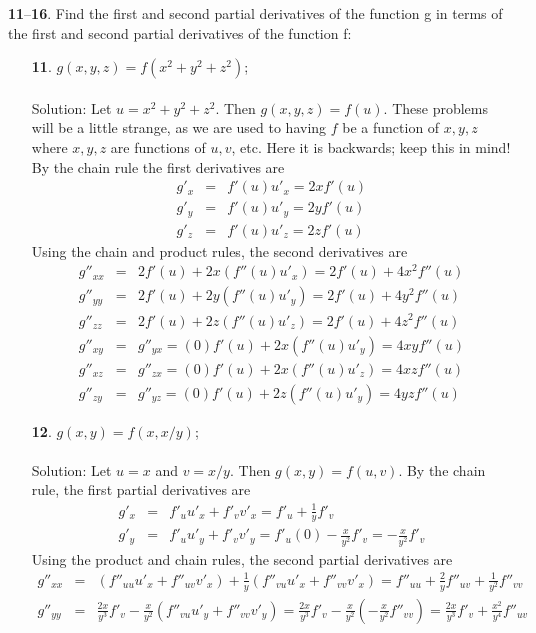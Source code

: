 \documentclass[12pt]{amsbook}
\begin{document}
{\small {\bf 11}--{\bf 16}}. Find the first and second partial derivatives of the function g in
terms of the first and second partial derivatives of the function f:
\begin{enumerate}
\item[{\small\bf 11}.] $g(x,y,z)=f(x^2+y^2+z^2)$;
\\
\\
{\sc Solution}: Let $u=x^2+y^2+z^2$. Then $g(x,y,z)=f(u)$. These problems will be a little strange, as we are used to having $f$ be a function of $x,y,z$ where $x,y,z$ are functions of $u,v$, etc. Here it is backwards; keep this in mind! By the chain rule the first derivatives are
\begin{eqnarray*}
g'_x&=&f'(u)u'_x=2xf'(u) \\
g'_y&=&f'(u)u'_y=2yf'(u) \\
g'_z&=&f'(u)u'_z=2zf'(u)
\end{eqnarray*}
Using the chain and product rules, the second derivatives are
\begin{eqnarray*}
g''_{xx}&=&2f'(u)+2x(f''(u)u'_x)=2f'(u)+4x^2f''(u) \\
g''_{yy}&=&2f'(u)+2y(f''(u)u'_y)=2f'(u)+4y^2f''(u) \\
g''_{zz}&=&2f'(u)+2z(f''(u)u'_z)=2f'(u)+4z^2f''(u) \\
g''_{xy}&=&g''_{yx}=(0)f'(u)+2x(f''(u)u'_y)=4xyf''(u) \\
g''_{xz}&=&g''_{zx}=(0)f'(u)+2x(f''(u)u'_z)=4xzf''(u) \\
g''_{zy}&=&g''_{yz}=(0)f'(u)+2z(f''(u)u'_y)=4yzf''(u) 
\end{eqnarray*}
\item[{\small\bf 12}.] $g(x,y)=f(x,x/y)$;
\\
\\
{\sc Solution}: Let $u=x$ and $v=x/y$. Then $g(x,y)=f(u,v)$. By the chain rule, the first partial derivatives are
\begin{eqnarray*}
g'_x&=&f'_uu'_x+f'_vv'_x=f'_u+\frac{1}{y}f'_v \\
g'_y&=&f'_uu'_y+f'_vv'_y=f'_u(0)-\frac{x}{y^2}f'_v=-\frac{x}{y^2}f'_v
\end{eqnarray*}
Using the product and chain rules, the second partial derivatives are
\begin{eqnarray*}
g''_{xx}&=&(f''_{uu}u'_x+f''_{uv}v'_x)+\frac{1}{y}(f''_{vu}u'_x+f''_{vv}v'_x)=f''_{uu}+\frac{2}{y}f''_{uv}+\frac{1}{y^2}f''_{vv} \\
g''_{yy}&=&\frac{2x}{y^3}f'_v-\frac{x}{y^2}(f''_{vu}u'_y+f''_{vv}v'_y)=\frac{2x}{y^3}f'_v-\frac{x}{y^2}(-\frac{x}{y^2}f''_{vv})=\frac{2x}{y^3}f'_v+\frac{x^2}{y^4}f''_{uv} \\

\end{eqnarray*}
\end{enumerate}
\end{document}
